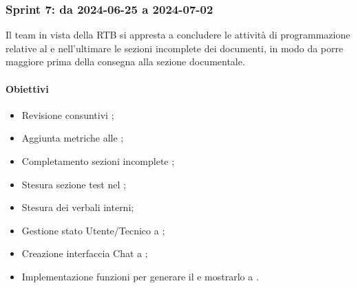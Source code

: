 \subsubsection{Sprint 7: da 2024-06-25 a 2024-07-02}
Il team in vista della RTB si appresta a concludere le attività di programmazione relative al  e nell'ultimare le sezioni incomplete dei documenti, in modo da porre maggiore prima della consegna alla sezione documentale.


\paragraph{Obiettivi}
\begin{itemize}
  \item Revisione consuntivi \PdP;
  \item Aggiunta metriche alle \NdP;
  \item Completamento sezioni incomplete \NdP;
  \item Stesura sezione test nel \PdQ;
  \item Stesura dei verbali interni;
  \item Gestione stato Utente/Tecnico a ;
  \item Creazione interfaccia Chat a ;
  \item Implementazione funzioni per generare il  e mostrarlo a .
\end{itemize}

\vspace{0.5\baselineskip}
\par [Inserire Gantt]
